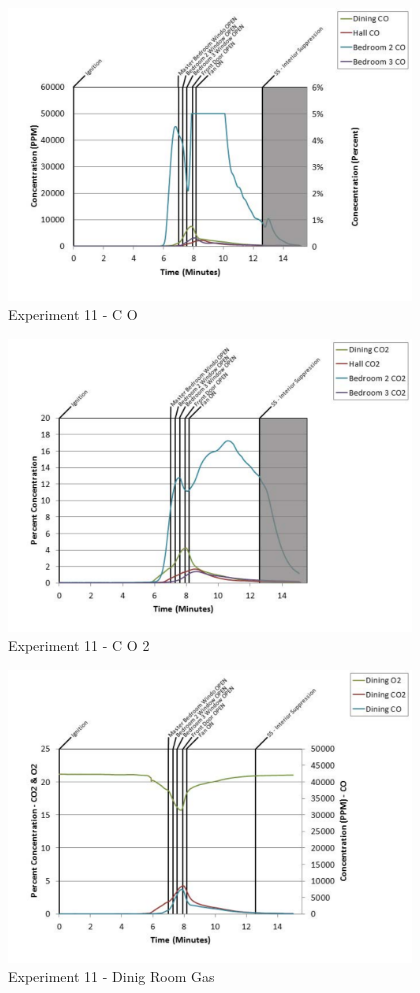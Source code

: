 \documentclass{article}
\begin{document}
\begin{appendices}
	\clearpage

	\begin{figure}[h!]
		\centering
		\includegraphics[height=3.05in]{0_Images/Results_Charts/Exp_11_Charts/CO.pdf}
		\caption{Experiment 11 - C O}
	\end{figure}
 

	\begin{figure}[h!]
		\centering
		\includegraphics[height=3.05in]{0_Images/Results_Charts/Exp_11_Charts/CO2.pdf}
		\caption{Experiment 11 - C O 2}
	\end{figure}
 
	\clearpage

	\begin{figure}[h!]
		\centering
		\includegraphics[height=3.05in]{0_Images/Results_Charts/Exp_11_Charts/DinigRoomGas.pdf}
		\caption{Experiment 11 - Dinig Room Gas}
	\end{figure}
 


\end{appendices}
\end{document}
